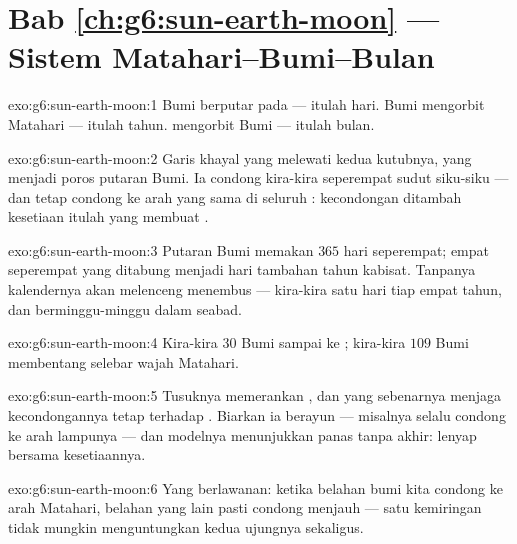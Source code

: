 \section*{Bab \ref{ch:g6:sun-earth-moon} --- Sistem Matahari--Bumi--Bulan}

\begin{solution}{exo:g6:sun-earth-moon:1}
Bumi berputar pada  --- itulah hari. Bumi mengorbit Matahari
--- itulah tahun.  mengorbit Bumi --- itulah bulan.
\end{solution}

\begin{solution}{exo:g6:sun-earth-moon:2}
Garis khayal yang melewati kedua kutubnya, yang menjadi poros putaran
Bumi. Ia condong kira-kira seperempat sudut siku-siku --- dan tetap
condong ke arah yang sama di seluruh : kecondongan ditambah
kesetiaan itulah yang membuat .
\end{solution}

\begin{solution}{exo:g6:sun-earth-moon:3}
Putaran Bumi memakan $365$ hari seperempat; empat seperempat yang
ditabung menjadi hari tambahan tahun kabisat. Tanpanya kalendernya
akan melenceng menembus  --- kira-kira satu hari tiap empat
tahun, dan berminggu-minggu dalam seabad.
\end{solution}

\begin{solution}{exo:g6:sun-earth-moon:4}
Kira-kira $30$ Bumi sampai ke ; kira-kira $109$ Bumi membentang
selebar wajah Matahari.
\end{solution}

\begin{solution}{exo:g6:sun-earth-moon:5}
Tusuknya memerankan , dan  yang sebenarnya menjaga
kecondongannya tetap terhadap . Biarkan ia berayun --- misalnya
selalu condong ke arah lampunya --- dan modelnya menunjukkan 
panas tanpa akhir:  lenyap bersama kesetiaannya.
\end{solution}

\begin{solution}{exo:g6:sun-earth-moon:6}
Yang berlawanan: ketika belahan bumi kita condong ke arah Matahari,
belahan yang lain pasti condong menjauh --- satu kemiringan tidak
mungkin menguntungkan kedua ujungnya sekaligus.
\end{solution}

